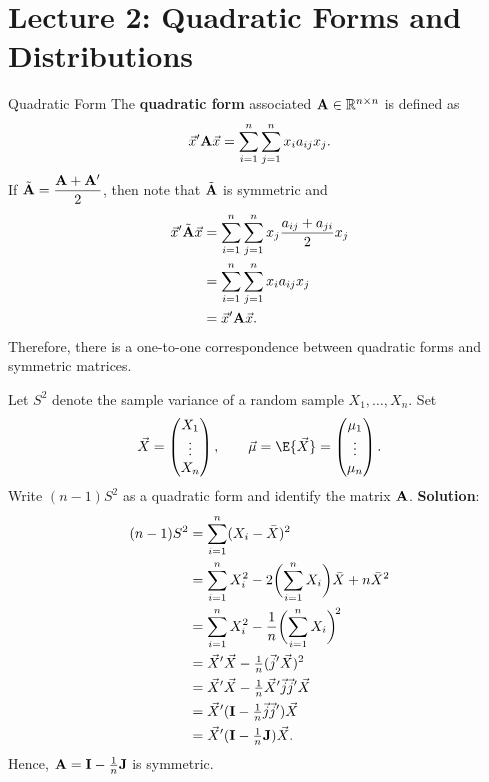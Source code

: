 \section{Lecture 2: Quadratic Forms and Distributions}
\begin{Definition}{Quadratic Form}{}
    The \textbf{quadratic form} associated $ \mathbf{A}\in\mathbb{R}^{n\times n} $
    is defined as
    \[ \vec{x}' \mathbf{A}\vec{x}=\sum_{i=1}^{n}\sum_{j=1}^{n}x_i a_{ij}x_j. \]
    \tcblower{}
    If $ \tilde{\mathbf{A}}=\dfrac{\mathbf{A}+\mathbf{A}'}{2} $,
    then note that $ \tilde{\mathbf{A}} $ is symmetric and
    \begin{align*}
        \vec{x}' \tilde{\mathbf{A}}\vec{x}
         & =\sum_{i=1}^{n}\sum_{j=1}^{n}x_j \frac{a_{ij}+a_{ji}}{2}x_j \\
         & =\sum_{i=1}^{n}\sum_{j=1}^{n}x_i a_{ij}x_j                  \\
         & =\vec{x}' \mathbf{A}\vec{x}.
    \end{align*}
    Therefore, there is a one-to-one correspondence between quadratic forms and symmetric matrices.
\end{Definition}
\begin{Example}{}{}
    Let $ S^2 $ denote the sample variance of a random sample $ X_1,\ldots,X_n $. Set
    \[ \Vector{X}=\begin{pmatrix}
            X_1    \\
            \vdots \\
            X_n
        \end{pmatrix},\qquad \Vector{\mu}=\E{\Vector{X}}=\begin{pmatrix}
            \mu_1  \\
            \vdots \\
            \mu_n
        \end{pmatrix}. \]
    Write $ (n-1)S^2 $ as a quadratic form and identify the matrix $ \mathbf{A} $.
    \tcblower{}
    \textbf{Solution}:
    \begin{align*}
        (n-1)S^2
         & =\sum_{i=1}^{n}(X_i-\bar{X})^2                                                \\
         & =\sum_{i=1}^{n}X_i^2-2\biggl(\sum_{i=1}^{n}X_i\biggr)\bar{X}+n\bar{X}^2       \\
         & =\sum_{i=1}^{n}X_i^2-\frac{1}{n}\biggl(\sum_{i=1}^{n}X_i\biggr)^{\!2}         \\
         & =\vec{X}'\vec{X}-\tfrac{1}{n}(\vec{j}' \vec{X})^2                 \\
         & =\vec{X}'\vec{X}-\tfrac{1}{n}\vec{X}'\vec{j}\vec{j}'\vec{X} \\
         & =\vec{X}'(\mathbf{I}-\tfrac{1}{n}\vec{j}\vec{j}')\vec{X}          \\
         & =\vec{X}'(\mathbf{I}-\tfrac{1}{n}\mathbf{J})\vec{X}.
    \end{align*}
    Hence, $ \mathbf{A}=\mathbf{I}-\tfrac{1}{n}\mathbf{J} $ is symmetric.
\end{Example}
